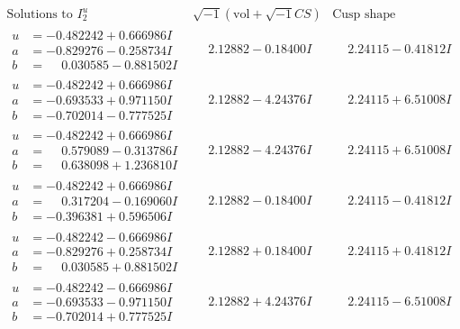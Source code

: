\documentclass[1p]{elsarticle_modified}
\theoremstyle{definition}
\newcommand{\I}{\sqrt{-1}}
\begin{document}
$$\begin{array}{c|c|c}  
\text{Solutions to }I^u_{2}& \I (\text{vol} + \sqrt{-1}CS) & \text{Cusp shape}\\
 \hline 
\begin{aligned}
u &= -0.482242 + 0.666986 I \\
a &= -0.829276 - 0.258734 I \\
b &= \phantom{-}0.030585 - 0.881502 I\end{aligned}
 & \phantom{-}2.12882 - 0.18400 I & \phantom{-}2.24115 - 0.41812 I \\ \hline\begin{aligned}
u &= -0.482242 + 0.666986 I \\
a &= -0.693533 + 0.971150 I \\
b &= -0.702014 - 0.777525 I\end{aligned}
 & \phantom{-}2.12882 - 4.24376 I & \phantom{-}2.24115 + 6.51008 I \\ \hline\begin{aligned}
u &= -0.482242 + 0.666986 I \\
a &= \phantom{-}0.579089 - 0.313786 I \\
b &= \phantom{-}0.638098 + 1.236810 I\end{aligned}
 & \phantom{-}2.12882 - 4.24376 I & \phantom{-}2.24115 + 6.51008 I \\ \hline\begin{aligned}
u &= -0.482242 + 0.666986 I \\
a &= \phantom{-}0.317204 - 0.169060 I \\
b &= -0.396381 + 0.596506 I\end{aligned}
 & \phantom{-}2.12882 - 0.18400 I & \phantom{-}2.24115 - 0.41812 I \\ \hline\begin{aligned}
u &= -0.482242 - 0.666986 I \\
a &= -0.829276 + 0.258734 I \\
b &= \phantom{-}0.030585 + 0.881502 I\end{aligned}
 & \phantom{-}2.12882 + 0.18400 I & \phantom{-}2.24115 + 0.41812 I \\ \hline\begin{aligned}
u &= -0.482242 - 0.666986 I \\
a &= -0.693533 - 0.971150 I \\
b &= -0.702014 + 0.777525 I\end{aligned}
 & \phantom{-}2.12882 + 4.24376 I & \phantom{-}2.24115 - 6.51008 I \\ \hline\begin{aligned}

\end{aligned}
\end{array}$$
\end{document}
